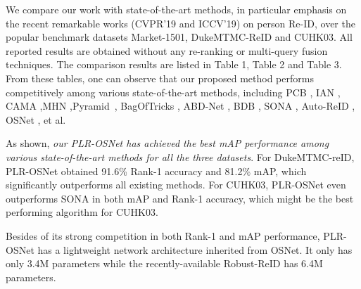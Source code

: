 \documentclass[journal]{IEEEtran}
\begin{document}
We compare our work with state-of-the-art methods, in particular emphasis on the recent remarkable works (CVPR'19 and ICCV'19) on person Re-ID, over the popular benchmark datasets Market-1501, DukeMTMC-ReID and CUHK03. All reported results are obtained without any re-ranking \cite{zhong2017re,saquib2018pose} or multi-query fusion \cite{zheng2015scalable} techniques. The comparison results are listed in Table 1, Table 2 and Table 3. From these tables, one can observe that our proposed method performs competitively among various state-of-the-art methods, including PCB \cite{sun2018beyond}, IAN \cite{hou2019IAN}, CAMA \cite{yang2019CAMA},MHN \cite{chen2019MHN},Pyramid~\cite{zheng2019pyramid}, BagOfTricks \cite{he2019Bag}, ABD-Net \cite{chen2019ABD}, BDB \cite{dai2019BDB}, SONA \cite{xia2019SONA}, Auto-ReID \cite{quan2019Auto}, OSNet \cite{zhou2019OSNet}, et al.

As shown, \textit{our PLR-OSNet has achieved the best mAP performance among various state-of-the-art methods for all the three datasets}. For DukeMTMC-reID, PLR-OSNet obtained 91.6\% Rank-1 accuracy and 81.2\% mAP, which significantly outperforms all existing methods. For CUHK03, PLR-OSNet even outperforms SONA in both mAP and Rank-1 accuracy, which might be the best performing algorithm for CUHK03.

Besides of its strong competition in both Rank-1 and mAP performance, PLR-OSNet has a lightweight network architecture inherited from OSNet. It only has only 3.4M parameters while the recently-available Robust-ReID has 6.4M parameters.
\end{document}
